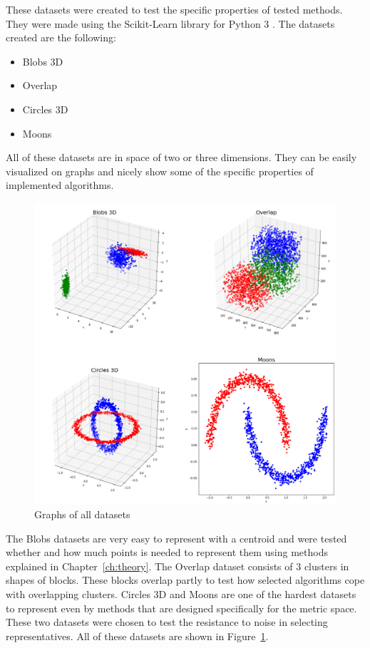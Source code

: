 \documentclass[thesis=B,english]{FITthesis}[2012/10/20]
\begin{document}
These datasets were created to test the specific properties of tested methods.
They were made using the Scikit-Learn library for Python 3 \cite{scikit-learn}.
The datasets created are the following:
\begin{itemize}
    \item Blobs 3D
    \item Overlap
    \item Circles 3D
    \item Moons
\end{itemize}
All of these datasets are in space of two or three dimensions.
They can be easily visualized on graphs and nicely show some of the specific properties of implemented algorithms.
\begin{figure}
  \includegraphics[width=\linewidth]{img/datasets.png}
  \caption{Graphs of all datasets}
  \label{img:datasets}
\end{figure}

The Blobs datasets are very easy to represent with a centroid and were tested whether and how much points is needed to represent them using methods explained in Chapter~\ref{ch:theory}.
The Overlap dataset consists of 3 clusters in shapes of blocks.
These blocks overlap partly to test how selected algorithms cope with overlapping clusters.
Circles 3D and Moons are one of the hardest datasets to represent even by methods that are designed specifically for the metric space.
These two datasets were chosen to test the resistance to noise in selecting representatives.
All of these datasets are shown in Figure~\ref{img:datasets}.
\end{document}
